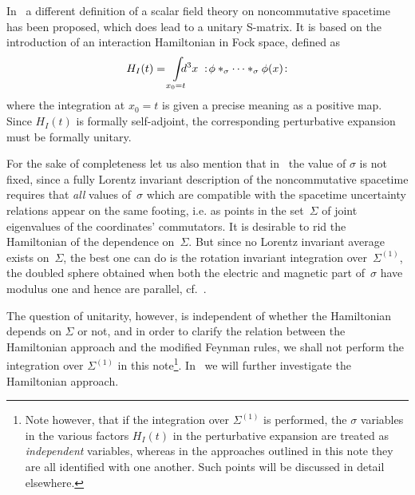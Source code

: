 \documentclass[a4paper,twoside,12pt]{article}
\begin{document}
In~\cite{dfr} a different definition of a scalar field theory on noncommutative
spacetime has been proposed, which does lead to a unitary S-matrix. It is based
on the introduction of an interaction Hamiltonian in Fock space, defined as 
$$
H_I(t)=\int\limits_{x_0=t} \hspace{-8pt} d^3x \;
:\!\phi*_\sigma\dots*_\sigma \phi (x)\!:
$$
where the integration at $x_0=t$ is given a precise meaning as a positive map.
Since $H_I(t)$ is  formally self-adjoint, the corresponding perturbative
expansion must be formally unitary. 

For the sake of  completeness  let us also mention that in~\cite{dfr} the value
of $\sigma$ is not fixed, since a fully Lorentz invariant description of the
noncommutative spacetime requires that {\sl all} values of~$\sigma$ which are
compatible with the spacetime uncertainty relations appear on the same footing,
i.e. as points in the set~$\Sigma$ of joint eigenvalues of the coordinates'
commutators. It is desirable to rid the Hamiltonian of the dependence
on~$\Sigma$. But since no  Lorentz  invariant average exists on~$\Sigma$, the
best one can do is the rotation invariant integration over~$\Sigma^{(1)}$, the
doubled sphere obtained when both the electric and magnetic part of~$\sigma$
have modulus one and hence are parallel, cf.~\cite{dfr}. 

The question of unitarity, however, is independent of whether the Hamiltonian
depends on $\Sigma$ or not, and in order to clarify the relation between the
Hamiltonian approach and the modified Feynman rules, we shall not perform
the integration over $\Sigma^{(1)}$ in this note\footnote{Note
however, that if the integration over $\Sigma^{(1)}$ is performed, the $\sigma$
variables in the various factors $H_I(t)$ in the perturbative expansion are
treated as {\sl independent} variables, whereas in the approaches outlined in
this note they are all identified with one another. Such points will be
discussed in detail elsewhere.}. In~\cite{BDFP} we will further investigate the
Hamiltonian approach.
\end{document}

